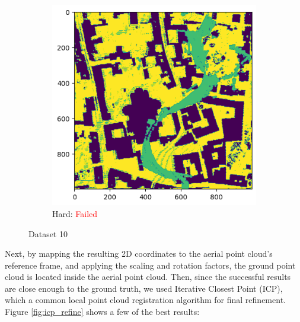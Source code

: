 \documentclass[11pt]{article}
\begin{document}
\begin{figure}[p]
        \vspace{1em}

        \begin{subfigure}{0.45\textwidth}
            \centering
            \includegraphics[width=\linewidth]{images/full/hard/5_2_3_hard}
            \caption{Hard: \textcolor{red}{Failed}}
            \label{fig:5_2_3_hard}
        \end{subfigure}
        \hfill

        \caption{Dataset 10}
        \label{fig:res_5_2_3}
    \end{figure}

    \clearpage

    Next, by mapping the resulting 2D coordinates to the aerial point cloud's reference frame, and applying the scaling
    and rotation factors, the ground point cloud is located inside the aerial point cloud. Then, since the successful results
    are close enough to the ground truth, we used Iterative Closest Point (ICP), which a common local point cloud
    registration algorithm for final refinement. Figure \ref{fig:icp_refine} shows a few of the best results:
\end{document}
